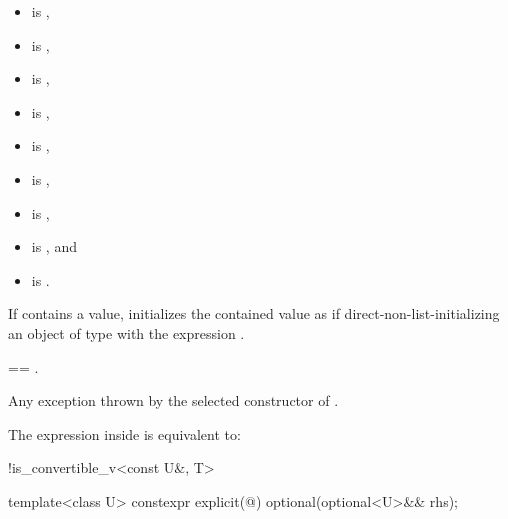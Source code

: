 \begin{itemdescr}
\pnum
\constraints
\begin{itemize}
\item {} is ,
\item {} is ,
\item {} is ,
\item {} is ,
\item {} is ,
\item {} is ,
\item {} is ,
\item {} is , and
\item {} is .
\end{itemize}

\pnum
\effects
If  contains a value,
initializes the contained value as if direct-non-list-initializing
an object of type  with the expression .

\pnum
\ensures
{} == .

\pnum
\throws
Any exception thrown by the selected constructor of .

\pnum
\remarks
The expression inside  is equivalent to:
\begin{codeblock}
!is_convertible_v<const U&, T>
\end{codeblock}
\end{itemdescr}

%
\begin{itemdecl}
template<class U> constexpr explicit(@\seebelow@) optional(optional<U>&& rhs);
\end{itemdecl}


